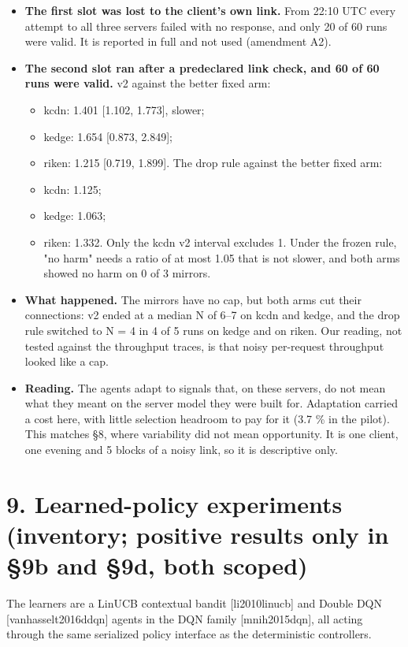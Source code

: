\documentclass[10pt,a4paper]{article}
\begin{document}
\begin{itemize}
\item \textbf{The first slot was lost to the client's own link.} From 22:10 UTC every attempt to all three servers failed with no response, and only 20 of 60 runs were valid. It is reported in full and not used (amendment A2).
\item \textbf{The second slot ran after a predeclared link check, and 60 of 60 runs were valid.} v2 against the better fixed arm:
\begin{itemize}
\item kcdn: 1.401 [1.102, 1.773], slower;
\item kedge: 1.654 [0.873, 2.849];
\item riken: 1.215 [0.719, 1.899]. The drop rule against the better fixed arm:
\item kcdn: 1.125;
\item kedge: 1.063;
\item riken: 1.332. Only the kcdn v2 interval excludes 1. Under the frozen rule, "no harm" needs a ratio of at most 1.05 that is not slower, and both arms showed no harm on 0 of 3 mirrors.
\end{itemize}
\item \textbf{What happened.} The mirrors have no cap, but both arms cut their connections: v2 ended at a median N of 6–7 on kcdn and kedge, and the drop rule switched to N = 4 in 4 of 5 runs on kedge and on riken. Our reading, not tested against the throughput traces, is that noisy per-request throughput looked like a cap.
\item \textbf{Reading.} The agents adapt to signals that, on these servers, do not mean what they meant on the server model they were built for. Adaptation carried a cost here, with little selection headroom to pay for it (3.7 \% in the pilot). This matches §8, where variability did not mean opportunity. It is one client, one evening and 5 blocks of a noisy link, so it is descriptive only.
\end{itemize}

\section*{9. Learned-policy experiments (inventory; positive results only in §9b and §9d, both scoped)}

The learners are a LinUCB contextual bandit [li2010linucb] and Double DQN [vanhasselt2016ddqn] agents in the DQN family [mnih2015dqn], all acting through the same serialized policy interface as the deterministic controllers.
\end{document}
